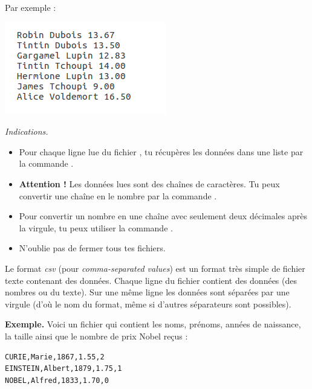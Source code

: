 \documentclass[11pt,class=report,crop=false]{standalone}
\begin{document}
\begin{activite}
\begin{enumerate}
    Par exemple :
\begin{center}
\includegraphics[scale=\myscale,scale=0.7]{ecran-fichiers-1b}
\end{center}  

  \emph{Indications.}
  \begin{itemize}
    	\item Pour chaque ligne lue du fichier , tu récupères les données dans  une liste par la commande .
    	
    	\item \textbf{Attention !} Les données lues sont des chaînes de caractères. Tu peux convertir une chaîne  en le nombre  par la commande .
    	
    	\item Pour convertir un nombre en une chaîne avec seulement deux décimales après la virgule, tu peux utiliser la commande .
    	
    	\item N'oublie pas de fermer tous tes fichiers.
    	
   \end{itemize}
    
\end{enumerate}   
     
\end{activite}



\begin{cours}
Le format \emph{csv} (pour  \emph{comma-separated values}) est un format très simple de fichier texte contenant des données.
Chaque ligne du fichier contient des données (des nombres ou du texte). Sur une même ligne les données sont séparées par une virgule (d'où le nom du format, même si d'autres séparateurs sont possibles).

\textbf{Exemple.} Voici un fichier qui contient les noms, prénoms, années de naissance, la taille ainsi que le nombre de prix Nobel reçus :
 \begin{center}
\begin{minipage}{0.4\textwidth}
\begin{lstlisting}
CURIE,Marie,1867,1.55,2
EINSTEIN,Albert,1879,1.75,1
NOBEL,Alfred,1833,1.70,0
\end{lstlisting}
\end{minipage}
\end{center}

\end{cours}
\end{document}
